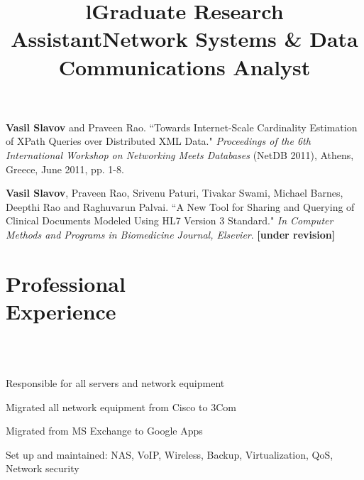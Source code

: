 \documentclass[margin,line]{resume}
\begin{document}
\begin{resume}
\vspace{-2mm}
    \textbf{Vasil Slavov} and Praveen Rao.
    ``Towards Internet-Scale Cardinality Estimation of XPath Queries over Distributed XML Data."
    \textsl{Proceedings of the 6th International Workshop on Networking Meets Databases} (NetDB 2011), Athens, Greece, June 2011, pp. 1-8.

    
\vspace{-2mm}
    \textbf{Vasil Slavov}, Praveen Rao, Srivenu Paturi, Tivakar Swami, Michael Barnes, Deepthi Rao and Raghuvarun Palvai.
    ``A New Tool for Sharing and Querying of Clinical Documents Modeled Using HL7 Version 3 Standard."
    \textsl{In Computer Methods and Programs in Biomedicine Journal, Elsevier}. \textbf{[under revision]}
    
    \section{\mysidestyle Professional\\Experience}
    
    \begin{format}
    \title{l}\\
    \\
    \end{format}

    \title{\textbf{Graduate Research Assistant}}
    \begin{position}\end{position}
    
    \title{\textbf{Network Systems \& Data Communications Analyst}}
    \begin{position}
    \vspace{-2mm}
    \begin{list2}
    \item Responsible for all servers and network equipment
    \item Migrated all network equipment from Cisco to 3Com
    \item Migrated from MS Exchange to Google Apps
    \item Set up and maintained: NAS, VoIP, Wireless, Backup, Virtualization, QoS, Network security
    \end{list2}
    \end{position}


\end{resume}
\end{document}
